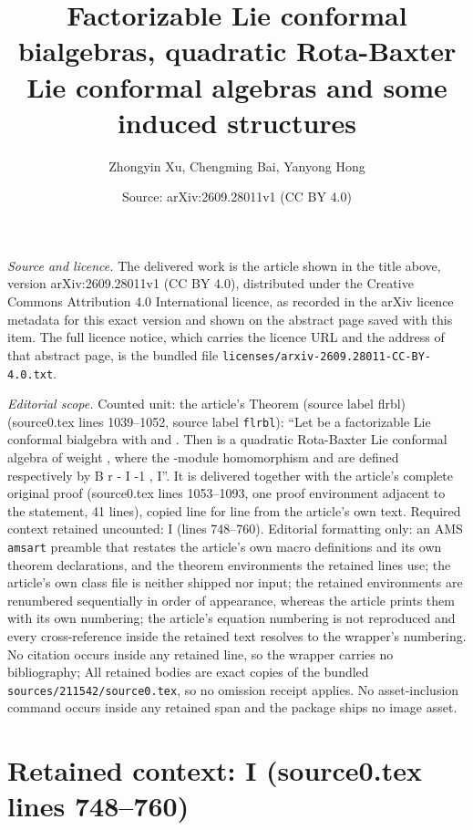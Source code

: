 \documentclass[10pt,a4paper]{amsart}
\title[Factorizable Lie conformal bialgebras, quadratic Rota-Baxter Lie conformal algebras and some induced structures]{Factorizable Lie conformal bialgebras, quadratic Rota-Baxter Lie conformal algebras and some induced structures}
\author{Zhongyin Xu, Chengming Bai, Yanyong Hong}
\date{Source: arXiv:2609.28011v1 (CC BY 4.0)}
\theoremstyle{plain}
\theoremstyle{definition}
\begin{document}
\maketitle

\noindent\emph{Source and licence.} The delivered work is the article shown in the title above, version arXiv:2609.28011v1 (CC BY 4.0), distributed under the Creative Commons Attribution 4.0 International licence, as recorded in the arXiv licence metadata for this exact version and shown on the abstract page saved with this item. The full licence notice, which carries the licence URL and the address of that abstract page, is the bundled file \texttt{licenses/arxiv-2609.28011-CC-BY-4.0.txt}.
\par\smallskip

\noindent\textit{Editorial scope.} Counted unit: the article's Theorem (source label flrbl) (source0.tex lines 1039--1052, source label \texttt{flrbl}): ``Let be a factorizable Lie conformal bialgebra with and . Then is a quadratic Rota-Baxter Lie conformal algebra of weight , where the -module homomorphism and are defined respectively by B r - I -1 , I''. It is delivered together with the article's complete original proof (source0.tex lines 1053--1093, one proof environment adjacent to the statement, 41 lines), copied line for line from the article's own text. Required context retained uncounted: I (lines 748--760). Editorial formatting only: an AMS \texttt{amsart} preamble that restates the article's own macro definitions and its own theorem declarations, and the theorem environments the retained lines use; the article's own class file is neither shipped nor input; the retained environments are renumbered sequentially in order of appearance, whereas the article prints them with its own numbering; the article's equation numbering is not reproduced and every cross-reference inside the retained text resolves to the wrapper's numbering. No citation occurs inside any retained line, so the wrapper carries no bibliography; All retained bodies are exact copies of the bundled \texttt{sources/211542/source0.tex}, so no omission receipt applies. No asset-inclusion command occurs inside any retained span and the package ships no image asset.


\section*{Retained context: I (source0.tex lines 748--760)}
\end{document}
